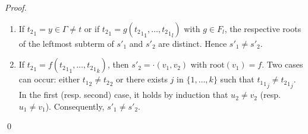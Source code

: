 \documentclass[a4paper]{llncs}
\begin{document}
\begin{proof}
\begin{enumerate}
\begin{enumerate}
\begin{enumerate}
\begin{enumerate}
    \item If ${t_2}_1=y\in\Gamma\neq t$ or if ${t_2}_1=g({{t_2}_1}_1,\ldots, {{t_2}_1}_l)$ with $g\in F_l$, the respective roots of the leftmost subterm of  $s'_1$ and $s'_2$ are distinct. Hence $s'_1\neq s'_2$.
    
    \item If ${t_2}_1=f({{t_2}_1}_1,\ldots, {{t_2}_1}_k)$, then $s'_2=\cdot(v_1,v_2)$ with $\mathrm{root}(v_1)=f$. 
    Two cases can occur: either ${t_1}_2\neq {t_2}_2$ or there exists $j$ in $\{1,\ldots,k\}$ such that ${{t_1}_1}_j\neq {{t_2}_1}_j$. 
    In the first (resp. second) case, it holds by induction that $u_2\neq v_2$ (resp. $u_1\neq v_1$). Consequently, $s'_1\neq s'_2$. 
    \end{enumerate}
    \end{enumerate}
    \end{enumerate}
    \end{enumerate}  
    \qed
  \end{proof}
  
\end{document}
